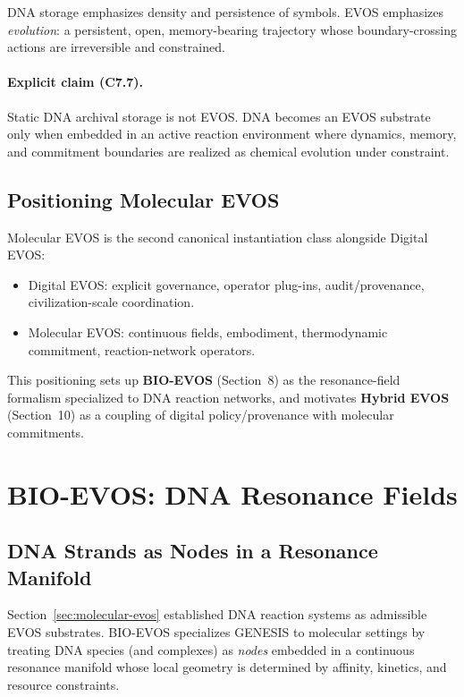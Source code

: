 \documentclass[11pt]{article}
\begin{document}
DNA storage emphasizes density and persistence of symbols. EVOS emphasizes \emph{evolution}:
a persistent, open, memory-bearing trajectory whose boundary-crossing actions are
irreversible and constrained.

\paragraph{Explicit claim (C7.7).}
Static DNA archival storage is not EVOS. DNA becomes an EVOS substrate only when embedded
in an active reaction environment where dynamics, memory, and commitment boundaries are
realized as chemical evolution under constraint.

\subsection{Positioning Molecular EVOS}
\label{sec:positioning-molecular}

Molecular EVOS is the second canonical instantiation class alongside Digital EVOS:
\begin{itemize}
  \item Digital EVOS: explicit governance, operator plug-ins, audit/provenance, civilization-scale coordination.
  \item Molecular EVOS: continuous fields, embodiment, thermodynamic commitment, reaction-network operators.
\end{itemize}

This positioning sets up \textbf{BIO-EVOS} (Section~8) as the resonance-field formalism
specialized to DNA reaction networks, and motivates \textbf{Hybrid EVOS} (Section~10) as
a coupling of digital policy/provenance with molecular commitments.

\section{BIO-EVOS: DNA Resonance Fields}
\label{sec:bio-evos}

\subsection{DNA Strands as Nodes in a Resonance Manifold}
\label{sec:dna-nodes}

Section~\ref{sec:molecular-evos} established DNA reaction systems as admissible EVOS
substrates. BIO-EVOS specializes GENESIS to molecular settings by treating DNA species
(and complexes) as \emph{nodes} embedded in a continuous resonance manifold whose local
geometry is determined by affinity, kinetics, and resource constraints.
\end{document}
